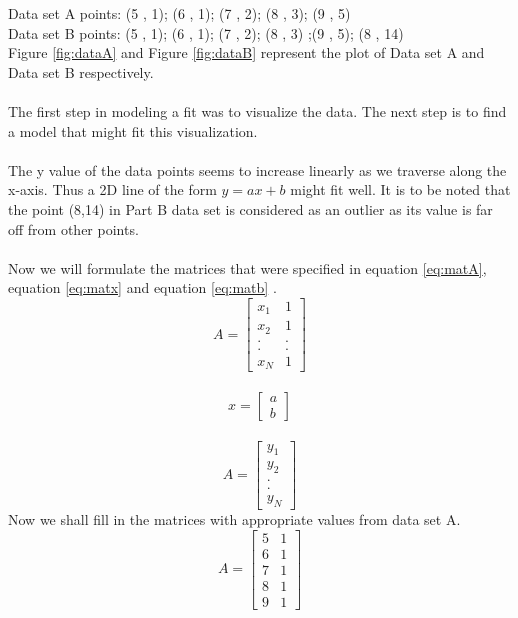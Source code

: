 \documentclass[12pt]{article}
\begin{document}
Data set A points: (5 , 1); (6 , 1); (7 , 2); (8 , 3); (9 , 5) \\
Data set B points: (5 , 1); (6 , 1); (7 , 2); (8 , 3) ;(9 , 5); (8 , 14) \\
Figure \ref{fig:dataA} and Figure \ref{fig:dataB} represent the plot of Data set A and Data set B respectively.  \\
\\
The first step in modeling a fit was to visualize the data. The next step is to find a model that might fit this visualization. \\ \\
The y value of the data points seems to increase linearly as we traverse along the x-axis. Thus a 2D line of the form $y = ax + b$ might fit well. It is to be noted that the point (8,14) in Part B data set is considered as an outlier as its value is far off from other points. \\
\\
Now we will formulate the matrices that were specified in equation \ref{eq:matA}, equation \ref{eq:matx} and equation \ref{eq:matb} .
\begin{equation}
A  = 
	\begin{bmatrix}
	x_1 & 1 \\
	x_2 & 1 \\
	. & . \\
	. & . \\
	x_N & 1
	\end{bmatrix}
\end{equation} \\
\begin{equation}
x  = 
	\begin{bmatrix}
	a \\
	b
	\end{bmatrix}
\end{equation} \\
\begin{equation}
A  = 
	\begin{bmatrix}
	y_1 \\
	y_2 \\
	.  \\
	.  \\
	y_N
	\end{bmatrix}
\end{equation}
Now we shall fill in the matrices with appropriate values from data set A. 
\begin{equation}
A  = 
	\begin{bmatrix}
	5 & 1 \\
	6 & 1 \\
	7 & 1 \\
	8 & 1\\
	9 & 1
	\end{bmatrix}
\end{equation} \\
\end{document}
